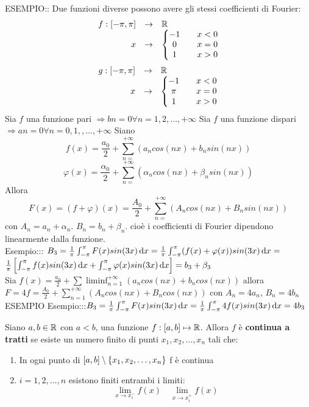 ESEMPIO:: Due funzioni diverse possono avere gli stessi coefficienti di Fourier:
\[\begin{array}{rcl} f: \left[-\pi,\pi\right] & \to &  \mathbb{R} \\
x & \to & \left\{\begin{matrix} -1 && x<0\\0&&x= 0\\1&&x>0 \end{matrix}\right.\end{array}\]
\[\begin{array}{rcl} g: \left[-\pi,\pi\right] & \to &  \mathbb{R} \\
x & \to & \left\{\begin{matrix} -1 && x<0\\\pi&&x= 0\\1&&x>0 \end{matrix}\right.\end{array}\]
\observation
Sia $f$ una funzione pari $\Rightarrow bn=0 \forall n=1,2,\dotsc,+\infty$
\observation
Sia $f$ una funzione dispari $\Rightarrow an=0 \forall n=0,1,,\dotsc,+\infty$
\observation
Siano
\[f(x)=\frac{a_0}{2}+\sum\limits_{n=}^{+\infty}\left(a_ncos(nx)+b_nsin(nx)\right)\]
\[\varphi(x)=\frac{\alpha_0}{2}+\sum\limits_{n=}^{+\infty}\left(\alpha_ncos(nx)+\beta_nsin(nx)\right)\]
Allora
\[ F(x)=(f+\varphi)(x)=\frac{A_0}{2}+\sum\limits_{n=}^{+\infty}\left(A_ncos(nx)+B_nsin(nx)\right)\]
con $A_n=a_n+\alpha_n$. $B_n=b_n+\beta_n$.
cioè i coefficienti di Fourier dipendono linearmente dalla funzione.\\
Esempio::: $B_3=\frac{1}{\pi}\int_{-\pi}^{\pi}F(x)sin(3x)\,\mathrm{d}{x}=\frac{1}{\pi}\int_{-\pi}^{\pi}(f(x)+\varphi(x))sin(3x)\,\mathrm{d}{x}=$\\
$\frac{1}{\pi}\left[\int_{-\pi}^{\pi}f(x)sin(3x)\,\mathrm{d}{x}+\int_{-\pi}^{\pi}\varphi(x)sin(3x)\,\mathrm{d}{x}\right]=b_3+\beta_3$\\
Sia $f(x)=\frac{a_0}{2}+\sum\liminf_{n=1}^{+\infty}\left(a_ncos(nx)+b_ncos(nx)\right)$ allora $F=4f=\frac{A_0}{2}+\sum\limits_{n=1}^{+\infty}\left(A_ncos(nx)+B_ncos(nx)\right)$ con $A_n=4a_n$, $B_n=4b_n$\\
ESEMPIO
Esempio:::$B_3=\frac{1}{\pi}\int_{-\pi}^{\pi}F(x)sin(3x)\,\mathrm{d}{x}=\frac{1}{\pi}\int_{-\pi}^{\pi}4f(x)sin(3x)\,\mathrm{d}{x}=4b_3$\\
\begin{definition}
	Siano $a,b\in \mathbb{R}$ con $a<b$, una funzione $f:\left[a,b\right] \mapsto \mathbb{R}$. Allora $f$ è \textbf{continua a tratti} se esiste un numero finito di punti $x_1,x_2,\dotsc,x_n$ tali che:
	\begin{enumerate}
		\item In ogni punto di $\left[a,b\right]\setminus\left\{x_1,x_2,\dotsc,x_n\right\}$ f è continua
		\item $i=1,2,\dotsc,n$ esistono finiti entrambi i limiti:
		\[\lim\limits_{x\to x_i^{-}}f(x)\quad \lim\limits_{x\to x_i^{+}}f(x)\]
	\end{enumerate}
\end{definition}


